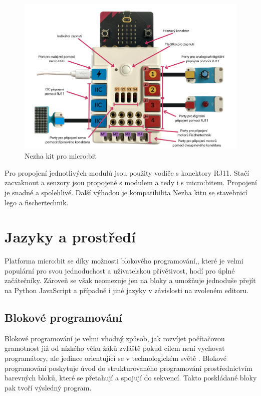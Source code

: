 \documentclass[
  digital,     %
  oneside,     %
  nosansbold,  %
  colorbold, %
  lof,         %
  nolot,         %
]{fithesis4}
\begin{document}
\begin{figure}
    \centering
    \includegraphics[width=\textwidth] {images/nezha.png}
    \caption{Nezha kit pro micro:bit}
    \label{nezha}
\end{figure}

Pro propojení jednotlivých modulů jsou použity vodiče s konektory RJ11. Stačí zacvaknout a senzory jsou propojené s modulem a tedy i s micro:bitem. Propojení je snadné a spolehlivé. Další výhodou je kompatibilita Nezha kitu se stavebnicí lego a fischertechnik.

\section{Jazyky a prostředí}
Platforma micro:bit se díky možnosti blokového programování,, které je velmi populární pro svou jednoduchost a uživatelskou přívětivost, hodí pro úplné začátečníky. Zároveň se však neomezuje jen na bloky a umožňuje jednoduše přejít na Python JavaScript a případně i jiné jazyky v závislosti na zvoleném editoru. 

\subsection{Blokové programování}
Blokové programování je velmi vhodný způsob, jak rozvíjet počítačovou gramotnost již od nízkého věku žáků zvláště pokud cílem není vychovat programátory, ale jedince orientující se v technologickém světě \cite{Weintrop19}. Blokové programování poskytuje úvod do strukturovaného programování prostřednictvím barevných bloků, které se přetahují a spojují do sekvencí. Takto poskládané bloky pak tvoří výsledný program.
\end{document}
